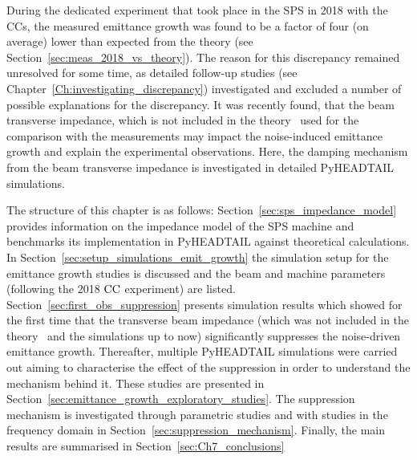 During the dedicated experiment that took place in the SPS
in 2018 with the CCs, the measured emittance
growth was found to be a factor of four (on average) lower than
expected from the theory (see Section~\ref{sec:meas_2018_vs_theory}). The reason for this discrepancy remained unresolved for some time, as detailed follow-up studies (see Chapter~\ref{Ch:investigating_discrepancy}) investigated and excluded a number of possible explanations for the discrepancy.
It was recently found, that the beam transverse impedance, which is not included in the theory~\cite{PhysRevSTAB.18.101001} used for the comparison with the measurements may impact the noise-induced emittance growth and explain the experimental observations. Here, the damping mechanism from the beam transverse impedance is investigated in detailed PyHEADTAIL simulations.

The structure of this chapter is as follows: Section~\ref{sec:sps_impedance_model} provides information on the impedance model of the SPS machine and benchmarks its implementation in PyHEADTAIL against theoretical calculations. In Section~\ref{sec:setup_simulations_emit_growth} the simulation setup for the emittance growth studies is discussed and the beam and machine parameters (following the 2018 ${\mathrm{CC}}$ experiment) are listed. Section~\ref{sec:first_obs_suppression} presents simulation results which showed for the first time that the transverse beam impedance (which was not included in the theory~\cite{PhysRevSTAB.18.101001} and the simulations up to now) significantly suppresses the noise-driven emittance growth. Thereafter, multiple PyHEADTAIL simulations were carried out aiming to characterise the effect of the suppression in order to understand the mechanism behind it. These studies are presented in Section~\ref{sec:emittance_growth_exploratory_studies}. The suppression mechanism is investigated through parametric studies and with studies in the frequency domain in Section~\ref{sec:suppression_mechanism}. Finally, the main results are summarised in Section~\ref{sec:Ch7_conclusions}


